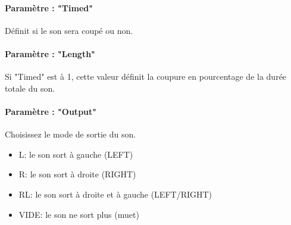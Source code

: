 \paragraph{Paramètre : "Timed"} Définit si le son sera coupé ou non.

\paragraph{Paramètre : "Length"} Si "Timed" est à 1, cette valeur définit la coupure en pourcentage de la durée totale du son.

\paragraph{Paramètre : "Output"} Choisissez le mode de sortie du son.
\medskip

\begin{itemize}
    \item{L: le son sort à gauche (LEFT)}
    \item{R: le son sort à droite (RIGHT)}
    \item{RL: le son sort à droite et à gauche (LEFT/RIGHT)}
    \item{VIDE: le son ne sort plus (muet)}
\end{itemize}
